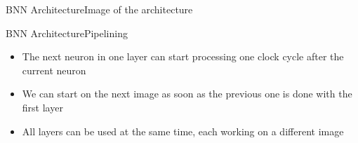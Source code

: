 \documentclass[10pt]{beamer}
\begin{document}
\begin{frame}{BNN Architecture}{Image of the architecture}
\end{frame}

\begin{frame}{BNN Architecture}{Pipelining}
\begin{itemize}
    \item The next neuron in one layer can start processing one clock cycle after the current neuron
    \item We can start on the next image as soon as the previous one is done with the first layer
    \item All layers can be used at the same time, each working on a different image
\end{itemize}
\end{frame}
\end{document}
